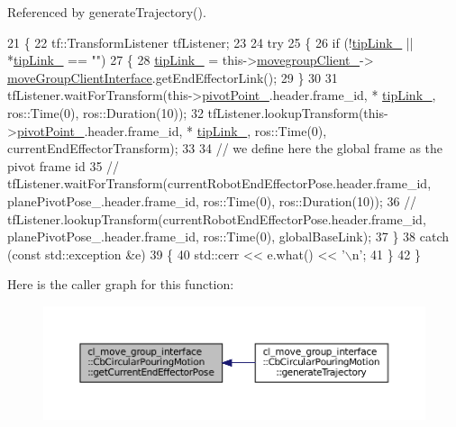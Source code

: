 Referenced by generate\+Trajectory().


\begin{DoxyCode}
21     \{
22         tf::TransformListener tfListener;
23 
24         \textcolor{keywordflow}{try}
25         \{
26             \textcolor{keywordflow}{if} (!\hyperlink{classcl__move__group__interface_1_1CbMoveEndEffectorTrajectory_a24c6c30b9b0761a61fa002d947bd3e11}{tipLink\_} || *\hyperlink{classcl__move__group__interface_1_1CbMoveEndEffectorTrajectory_a24c6c30b9b0761a61fa002d947bd3e11}{tipLink\_} == \textcolor{stringliteral}{""})
27             \{
28                 \hyperlink{classcl__move__group__interface_1_1CbMoveEndEffectorTrajectory_a24c6c30b9b0761a61fa002d947bd3e11}{tipLink\_} = this->\hyperlink{classcl__move__group__interface_1_1CbMoveEndEffectorTrajectory_aea650d3e7836125b32be97392b71a7f3}{movegroupClient\_}->
      \hyperlink{classcl__move__group__interface_1_1ClMoveGroup_a92922ea689e4e1b7b91512c56629c95b}{moveGroupClientInterface}.getEndEffectorLink();
29             \}
30 
31             tfListener.waitForTransform(this->\hyperlink{classcl__move__group__interface_1_1CbCircularPouringMotion_a4c100d8ba3e57f7ddfb614017d115fca}{pivotPoint\_}.header.frame\_id, *
      \hyperlink{classcl__move__group__interface_1_1CbMoveEndEffectorTrajectory_a24c6c30b9b0761a61fa002d947bd3e11}{tipLink\_}, ros::Time(0), ros::Duration(10));
32             tfListener.lookupTransform(this->\hyperlink{classcl__move__group__interface_1_1CbCircularPouringMotion_a4c100d8ba3e57f7ddfb614017d115fca}{pivotPoint\_}.header.frame\_id, *
      \hyperlink{classcl__move__group__interface_1_1CbMoveEndEffectorTrajectory_a24c6c30b9b0761a61fa002d947bd3e11}{tipLink\_}, ros::Time(0), currentEndEffectorTransform);
33 
34             \textcolor{comment}{// we define here the global frame as the pivot frame id}
35             \textcolor{comment}{// tfListener.waitForTransform(currentRobotEndEffectorPose.header.frame\_id,
       planePivotPose\_.header.frame\_id, ros::Time(0), ros::Duration(10));}
36             \textcolor{comment}{// tfListener.lookupTransform(currentRobotEndEffectorPose.header.frame\_id,
       planePivotPose\_.header.frame\_id, ros::Time(0), globalBaseLink);}
37         \}
38         \textcolor{keywordflow}{catch} (\textcolor{keyword}{const} std::exception &e)
39         \{
40             std::cerr << e.what() << \textcolor{charliteral}{'\(\backslash\)n'};
41         \}
42     \}
\end{DoxyCode}
Here is the caller graph for this function\+:
\nopagebreak
\begin{figure}[H]
\begin{center}
\leavevmode
\includegraphics[width=350pt]{classcl__move__group__interface_1_1CbCircularPouringMotion_a0cc72cc5233ecb0c264621d4d9501b30_icgraph}
\end{center}
\end{figure}


